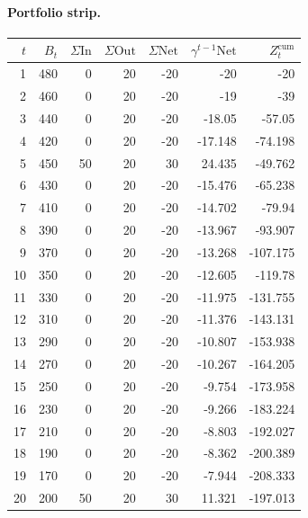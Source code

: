 \documentclass[12pt, a4paper]{article}
\begin{document}
\paragraph{Portfolio strip.}
\begin{center}
\begin{tabular}{rrrrrrr}
\toprule
$t$ & $B_t$ & $\Sigma\mathrm{In}$ & $\Sigma\mathrm{Out}$ & $\Sigma\mathrm{Net}$ & $\gamma^{t-1}\mathrm{Net}$ & $Z_t^{\mathrm{cum}}$\\
\midrule
1 & 480 & 0 & 20 & -20 & -20 & -20 \\
2 & 460 & 0 & 20 & -20 & -19 & -39 \\
3 & 440 & 0 & 20 & -20 & -18.05 & -57.05 \\
4 & 420 & 0 & 20 & -20 & -17.148 & -74.198 \\
5 & 450 & 50 & 20 & 30 & 24.435 & -49.762 \\
6 & 430 & 0 & 20 & -20 & -15.476 & -65.238 \\
7 & 410 & 0 & 20 & -20 & -14.702 & -79.94 \\
8 & 390 & 0 & 20 & -20 & -13.967 & -93.907 \\
9 & 370 & 0 & 20 & -20 & -13.268 & -107.175 \\
10 & 350 & 0 & 20 & -20 & -12.605 & -119.78 \\
11 & 330 & 0 & 20 & -20 & -11.975 & -131.755 \\
12 & 310 & 0 & 20 & -20 & -11.376 & -143.131 \\
13 & 290 & 0 & 20 & -20 & -10.807 & -153.938 \\
14 & 270 & 0 & 20 & -20 & -10.267 & -164.205 \\
15 & 250 & 0 & 20 & -20 & -9.754 & -173.958 \\
16 & 230 & 0 & 20 & -20 & -9.266 & -183.224 \\
17 & 210 & 0 & 20 & -20 & -8.803 & -192.027 \\
18 & 190 & 0 & 20 & -20 & -8.362 & -200.389 \\
19 & 170 & 0 & 20 & -20 & -7.944 & -208.333 \\
20 & 200 & 50 & 20 & 30 & 11.321 & -197.013 \\
\bottomrule
\end{tabular}
\end{center}
\end{document}
